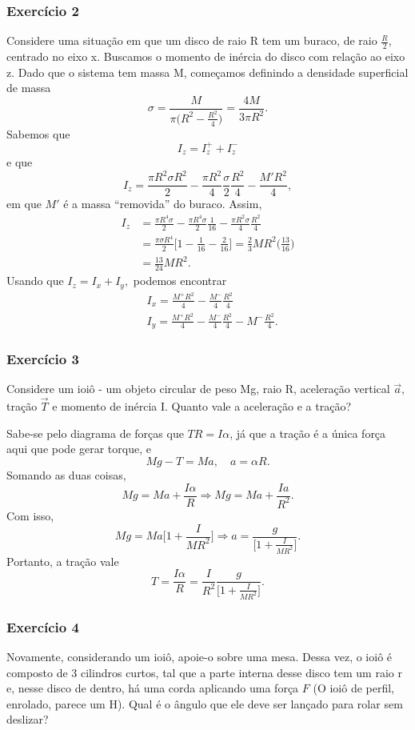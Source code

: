 \documentclass{article}
\begin{document}
\subsubsection{Exercício 2}
Considere uma situação em que um disco de raio R tem um buraco, de raio \(\frac{R}{2}\), centrado no eixo x. Buscamos o momento de inércia do disco com relação ao eixo z. 
Dado que o sistema tem massa M, começamos definindo a densidade superficial de massa 
\[
  \sigma = \frac{M}{\pi \biggl(R^{2}-\frac{R^{2}}{4}\biggr)} = \frac{4M}{3\pi R^{2}}.
\]
Sabemos que 
\[
  I_{z} = I_{z}^{+} + I_{z}^{-} 
\]
e que 
\[
  I_{z} = \frac{\pi R^{2}\sigma R^{2}}{2} - \frac{\pi R^{2}}{4}\frac{\sigma }{2}\frac{R^{2}}{4} - \frac{M'R^{2}}{4},
\]
em que \(M'\) é a massa ``removida'' do buraco. Assim, 
\begin{align*}
  I_{z} &= \frac{\pi R^{4}\sigma }{2} - \frac{\pi R^{4}\sigma }{2}\frac{1}{16} - \frac{\pi R^{2}\sigma }{4}\frac{R^{2}}{4}\\
        &= \frac{\pi \sigma R^{4}}{2}\biggl[1-\frac{1}{16}-\frac{2}{16}\biggr] = \frac{2}{3}MR^{2}\biggl(\frac{13}{16}\biggr)\\
        &= \frac{13}{24}MR^{2}.
\end{align*}
Usando que \(I_{z} = I_{x} + I_{y},\) podemos encontrar 
\begin{align*}
   &I_{x} = \frac{M^{+}R^{2}}{4} - \frac{M^{-}}{4}\frac{R^{2}}{4}\\
   &I_{y} = \frac{M^{+}R^{2}}{4} - \frac{M^{-}}{4}\frac{R^{2}}{4} - M^{-}\frac{R^{2}}{4}.
\end{align*}
\subsubsection{Exercício 3}
Considere um ioiô - um objeto circular de peso Mg, raio R, aceleração vertical \(\vec{a},\) tração \(\vec{T}\) e momento de inércia I. Quanto vale a aceleração e a tração?

Sabe-se pelo diagrama de forças que \(TR = I\alpha \), já que a tração é a única força aqui que pode gerar torque, e 
\[
  Mg - T = Ma,\quad a = \alpha R.
\]
Somando as duas coisas, 
\[
  Mg = Ma + \frac{I\alpha }{R} \Rightarrow Mg = Ma + \frac{Ia}{R^{2}}.
\]
Com isso, 
\[
  Mg = Ma \biggl[1 + \frac{I}{MR^{2}}\biggr] \Rightarrow a = \frac{g}{\biggl[1 + \frac{I}{MR^{2}}\biggr]}.
\]
Portanto, a tração vale 
\[
  T = \frac{I\alpha }{R} = \frac{I}{R^{2}}\frac{g}{\biggl[1 + \frac{I}{MR^{2}}\biggr]}.
\]
\subsubsection{Exercício 4}
Novamente, considerando um ioiô, apoie-o sobre uma mesa. Dessa vez, o ioiô é composto de 3 cilindros curtos, tal que a parte interna desse disco tem um raio r e,
nesse disco de dentro, há uma corda aplicando uma força \(F\) (O ioiô de perfil, enrolado, parece um H). Qual é o ângulo que ele deve ser lançado para rolar
sem deslizar?
\end{document}
